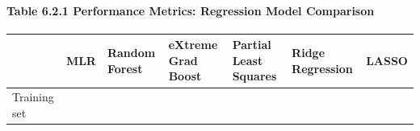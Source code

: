 \documentclass[]{article}
\let\oldparagraph\paragraph
\renewcommand{\paragraph}[1]{\oldparagraph{#1}\mbox{}}
\begin{document}
\paragraph{Table 6.2.1 Performance Metrics: Regression Model
Comparison}\label{table-6.2.1-performance-metrics-regression-model-comparison}

\begin{longtable}[]{@{}lllllll@{}}
\toprule
\begin{minipage}[b]{0.11\columnwidth}\raggedright\strut
\strut
\end{minipage} & \begin{minipage}[b]{0.06\columnwidth}\raggedright\strut
MLR\strut
\end{minipage} & \begin{minipage}[b]{0.11\columnwidth}\raggedright\strut
Random Forest\strut
\end{minipage} & \begin{minipage}[b]{0.15\columnwidth}\raggedright\strut
eXtreme Grad Boost\strut
\end{minipage} & \begin{minipage}[b]{0.17\columnwidth}\raggedright\strut
Partial Least Squares\strut
\end{minipage} & \begin{minipage}[b]{0.14\columnwidth}\raggedright\strut
Ridge Regression\strut
\end{minipage} & \begin{minipage}[b]{0.06\columnwidth}\raggedright\strut
LASSO\strut
\end{minipage}\tabularnewline
\midrule
\endhead
\begin{minipage}[t]{0.11\columnwidth}\raggedright\strut
Training set\strut
\end{minipage} & \begin{minipage}[t]{0.06\columnwidth}\raggedright\strut
\strut
\end{minipage} & \begin{minipage}[t]{0.11\columnwidth}\raggedright\strut
\strut
\end{minipage} & \begin{minipage}[t]{0.15\columnwidth}\raggedright\strut
\strut
\end{minipage} & \begin{minipage}[t]{0.17\columnwidth}\raggedright\strut
\strut
\end{minipage} & \begin{minipage}[t]{0.14\columnwidth}\raggedright\strut
\strut
\end{minipage} & \begin{minipage}[t]{0.06\columnwidth}\raggedright\strut

\end{minipage}
\end{longtable}
\end{document}
